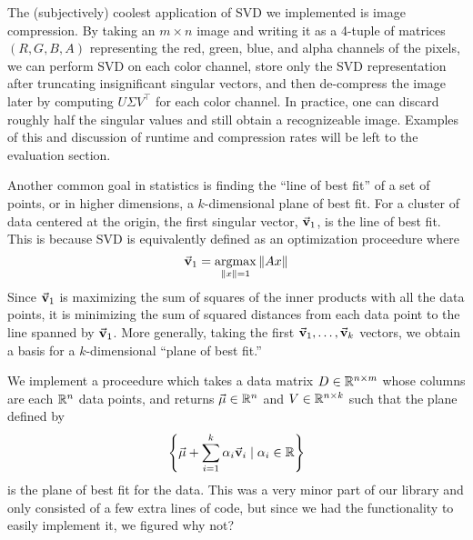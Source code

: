 The (subjectively) coolest application of SVD we implemented is image compression. By taking an $m \times n$ image and 
writing it as a 4-tuple of matrices $(R, G, B, A)$ representing the red, green, blue, and alpha channels of the pixels,
we can perform SVD on each color channel, store only the SVD representation after truncating insignificant singular
vectors, and then de-compress the image later by computing $U \Sigma V^\top$ for each color channel. In practice,
one can discard roughly half the singular values and still obtain a recognizeable image. Examples of this and discussion 
of runtime and compression rates will be left to the evaluation section.

Another common goal in statistics is finding the ``line of best fit'' of a set of points, or in higher dimensions,
a $k$-dimensional plane of best fit. For a cluster of data centered at the origin, the first singular vector, $\vec{\mathbf{v}}_1$,
is the line of best fit. This is because SVD is equivalently defined as an optimization proceedure where 
\[
    \vec{\mathbf{v}}_1 = \operatorname*{argmax}_{\|x\| = 1} \|Ax\|
\]
Since $\vec{\mathbf{v}}_1$ is maximizing the sum of squares of the inner products with all the data points, it is minimizing 
the sum of squared distances from each data point to the line spanned by $\vec{\mathbf{v}}_1$. More generally, taking the first 
$\vec{\mathbf{v}}_1, \ldots, \vec{\mathbf{v}}_k$ vectors, we obtain a basis for a $k$-dimensional ``plane of best fit.'' 

We implement a proceedure which takes a data matrix $D \in \mathbb{R}^{n \times m}$ whose columns are each $\mathbb{R}^n$ data points, 
and returns $\vec{\mathbf{\mu}} \in \mathbb{R}^n$ and $V \in \mathbb{R}^{n \times k}$ such that the plane defined by 
\[
    \left\{\vec{\mathbf{\mu}} + \sum_{i = 1}^{k} \alpha_i \vec{\mathbf{v}}_i \mid \alpha_i \in \mathbb{R}\right\}
\]
is the plane of best fit for the data. This was a very minor part of our library and only consisted 
of a few extra lines of code, but since we had the functionality to easily implement it, we figured why not?